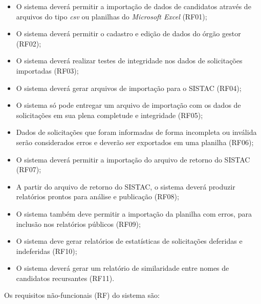 \documentclass[
	12pt,			%
	openright,		%
	oneside,	
	a4paper,		%
	english,		%
	brazil			%
]{abntex2/abntex2}  %
\begin{document}
		\begin{itemize}

			\item O sistema deverá permitir a importação de dados de candidatos através de arquivos do tipo \textit{csv} ou planilhas do \textit{Microsoft Excel} (RF01);
			\item O sistema deverá permitir o cadastro e edição de dados do órgão gestor (RF02);
			\item O sistema deverá realizar testes de integridade nos dados de solicitações importadas (RF03);
			\item O sistema deverá gerar arquivos de importação para o SISTAC (RF04);
			\item O sistema só pode entregar um arquivo de importação com os dados de solicitações em sua plena completude e integridade (RF05);
			\item Dados de solicitações que foram informadas de forma incompleta ou inválida serão considerados erros e deverão ser exportados em uma planilha (RF06);
			\item O sistema deverá permitir a importação do arquivo de retorno do SISTAC (RF07);
			\item A partir do arquivo de retorno do SISTAC, o sistema deverá produzir relatórios prontos para análise e publicação (RF08);
			\item O sistema também deve permitir a importação da planilha com erros, para inclusão nos relatórios públicos (RF09);
			\item O sistema deve gerar relatórios de estatísticas de solicitações deferidas e indeferidas (RF10);
			\item O sistema deverá gerar um relatório de similaridade entre nomes de candidatos recursantes (RF11).
			
		\end{itemize}
	
		Os requisitos não-funcionais (RF) do sistema são:
	
\end{document}
